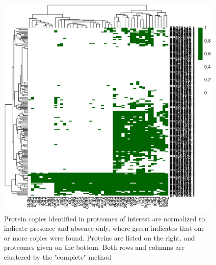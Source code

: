 
\begin{figure}
\begin{center}
\includegraphics{./Appendix/img/heatmap.png}
\end{center}
\caption[Heatmap cluster analysis of flagellar proteins from \textit{Naegleria gruberi}]{Protein copies identified in proteomes of interest are normalized to indicate presence and absence only, where green indicates that one or more copies were found. Proteins are listed on the right, and proteomes given on the bottom. Both rows and columns are clustered by the "complete" method}
\label{fig:AppFlag_heatmap}
\end{figure}
